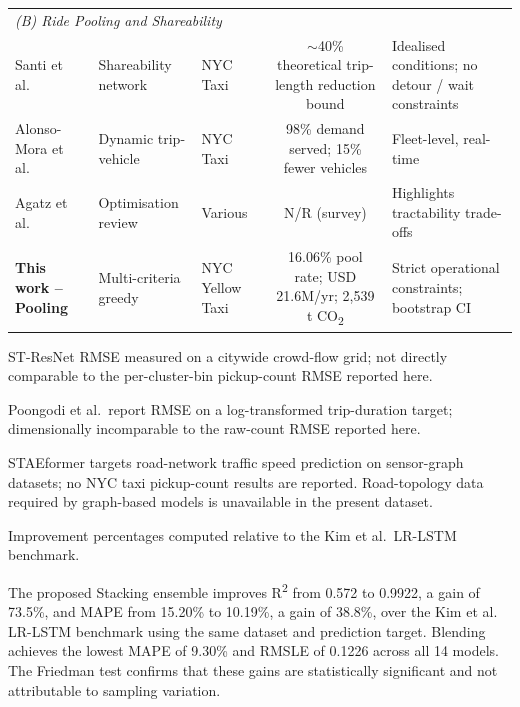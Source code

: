 \documentclass[a4paper,fleqn]{cas-dc}
\begin{document}
\begin{table}[t]
\begin{threeparttable}
\begin{tabular}{@{}p{2.6cm}p{2.0cm}p{2.2cm}rrrp{2.8cm}@{}}
\multicolumn{7}{l}{\textit{(B) Ride Pooling and Shareability}} \\[2pt]
Santi et al.~\cite{santi2014quantifying} & Shareability network & NYC Taxi &
  \multicolumn{3}{c}{$\sim$40\% theoretical trip-length reduction bound} &
  Idealised conditions; no detour / wait constraints \\
Alonso-Mora et al.~\cite{alonso2017demand} & Dynamic trip-vehicle & NYC Taxi &
  \multicolumn{3}{c}{98\% demand served; 15\% fewer vehicles} &
  Fleet-level, real-time \\
Agatz et al.~\cite{agatz2012ridesharing} & Optimisation review & Various &
  \multicolumn{3}{c}{N/R (survey)} &
  Highlights tractability trade-offs \\
\textbf{This work -- Pooling} & Multi-criteria greedy & NYC Yellow Taxi &
  \multicolumn{3}{c}{16.06\% pool rate; USD 21.6M/yr; 2{,}539 t CO\textsubscript{2}} &
  Strict operational constraints; bootstrap CI \\
\bottomrule
\end{tabular}
\begin{tablenotes}
  \small
  \item[$\dagger$] ST-ResNet RMSE measured on a citywide crowd-flow grid; not directly comparable to the per-cluster-bin pickup-count RMSE reported here.
  \item[$\ddagger$] Poongodi et al.\ report RMSE on a log-transformed trip-duration target; dimensionally incomparable to the raw-count RMSE reported here.
  \item[$\S$] STAEformer targets road-network traffic speed prediction on sensor-graph datasets; no NYC taxi pickup-count results are reported.  Road-topology data required by graph-based models is unavailable in the present dataset.
  \item Improvement percentages computed relative to the Kim et al.\ LR-LSTM benchmark.
\end{tablenotes}
\end{threeparttable}
\end{table}

The proposed Stacking ensemble improves R\textsuperscript{2} from 0.572 to 0.9922, a gain of 73.5\%, and MAPE from 15.20\% to 10.19\%, a gain of 38.8\%, over the Kim et al.~\cite{kim2020hybrid} LR-LSTM benchmark using the same dataset and prediction target.  Blending achieves the lowest MAPE of 9.30\% and RMSLE of 0.1226 across all 14 models.  The Friedman test confirms that these gains are statistically significant and not attributable to sampling variation.
\end{document}
